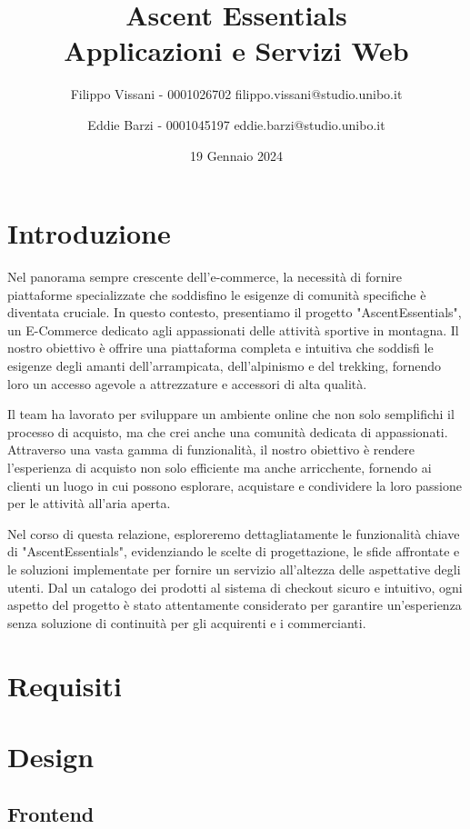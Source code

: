 \documentclass[12pt,a4paper,openright,twoside]{book}
\title{
    Ascent Essentials \\
    \large Applicazioni e Servizi Web
}
\author{
    Filippo Vissani - 0001026702 filippo.vissani@studio.unibo.it
    \and
    Eddie Barzi - 0001045197 eddie.barzi@studio.unibo.it
}
\date{19 Gennaio 2024}
\begin{document}
\maketitle
\chapter{Introduzione}
Nel panorama sempre crescente dell'e-commerce, la necessità di fornire piattaforme specializzate che soddisfino le esigenze di comunità specifiche è diventata cruciale. In questo contesto, presentiamo il progetto "AscentEssentials", un E-Commerce dedicato agli appassionati delle attività sportive in montagna. Il nostro obiettivo è offrire una piattaforma completa e intuitiva che soddisfi le esigenze degli amanti dell'arrampicata, dell'alpinismo e del trekking, fornendo loro un accesso agevole a attrezzature e accessori di alta qualità.

Il team ha lavorato per sviluppare un ambiente online che non solo semplifichi il processo di acquisto, ma che crei anche una comunità dedicata di appassionati. Attraverso una vasta gamma di funzionalità, il nostro obiettivo è rendere l'esperienza di acquisto non solo efficiente ma anche arricchente, fornendo ai clienti un luogo in cui possono esplorare, acquistare e condividere la loro passione per le attività all'aria aperta.

Nel corso di questa relazione, esploreremo dettagliatamente le funzionalità chiave di "AscentEssentials", evidenziando le scelte di progettazione, le sfide affrontate e le soluzioni implementate per fornire un servizio all'altezza delle aspettative degli utenti. Dal un catalogo dei prodotti al sistema di checkout sicuro e intuitivo, ogni aspetto del progetto è stato attentamente considerato per garantire un'esperienza senza soluzione di continuità per gli acquirenti e i commercianti.

\chapter{Requisiti}

\chapter{Design}

\section{Frontend}
\end{document}
